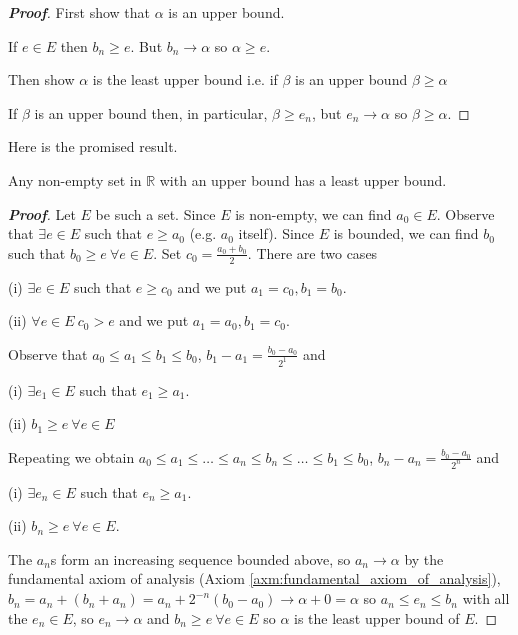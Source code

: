 \begin{proof}[\bf Proof]
First show that $\alpha$ is an upper bound.

If $e \in E$ then $b_n \geq e$. But $b_n \to \alpha$ so $\alpha \geq e$.

Then show $\alpha$ is the least upper bound i.e. if $\beta$ is an upper bound $\beta \geq \alpha$

If $\beta$ is an upper bound then, in particular, $\beta \geq e_n$, but $e_n \to \alpha$ so $\beta \geq \alpha$.
\end{proof}



Here is the promised result.

\begin{theorem}\label{thm:upper_bound_implies_least_upper_bound}
Any non-empty set in $\mathbb{R}$ with an upper bound has a least upper bound.
\end{theorem}

\begin{proof}[\bf Proof]
Let $E$ be such a set. Since $E$ is non-empty, we can find $a_0 \in E$. Observe that $\exists e \in E$ such that $e \geq a_0$ (e.g. $a_0$ itself). Since $E$ is bounded, we can find $b_0$ such that $b_0 \geq e \ \forall e \in E$. Set $c_0 = \frac{a_0 + b_0}{2}$. There are two cases
\ben
\item [(i)] $\exists e \in E$ such that $e \geq c_0$ and we put $a_1 = c_0, b_1 = b_0$.
\item [(ii)] $\forall e \in E \ c_0 > e$ and we put $a_1 = a_0, b_1 = c_0$.
\een

Observe that $a_0 \leq a_1 \leq b_1 \leq b_0$, $b_1 - a_1 = \frac{b_0 - a_0}{2^1}$ and
\ben
\item [(i)] $\exists e_1 \in E$ such that $e_1 \geq a_1$.
\item [(ii)] $b_1 \geq e \ \forall e \in E$
\een

Repeating we obtain $a_0 \leq a_1  \leq \ldots \leq a_n \leq b_n \leq \ldots \leq b_1 \leq b_0$, $b_n - a_n = \frac{b_0 - a_0}{2^n}$ and
\ben
\item [(i)] $\exists e_n \in E$ such that $e_n \geq a_1$.
\item [(ii)] $b_n \geq e \ \forall e \in E$.
\een

The $a_n$s form an increasing sequence bounded above, so $a_n \rightarrow \alpha$ by the fundamental axiom of analysis (Axiom \ref{axm:fundamental_axiom_of_analysis}), $b_n = a_n + (b_n + a_n) = a_n + 2^{-n} (b_0 - a_0) \rightarrow \alpha + 0 = \alpha$ so $a_n \leq e_n \leq b_n$ with all the $e_n \in E$, so $e_n \rightarrow \alpha$ and $b_n \geq e \ \forall e \in E$ so $\alpha$ is the least upper bound of $E$.
\end{proof}


